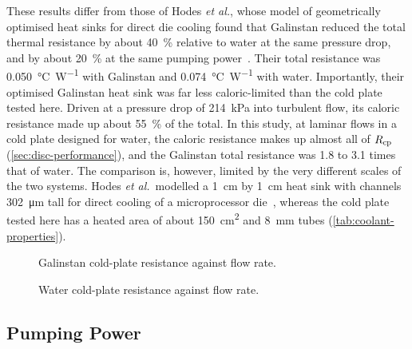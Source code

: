 These results differ from those of Hodes \emph{et al.}, whose model of
geometrically optimised heat sinks for direct die cooling found that Galinstan
reduced the total thermal resistance by about \SI{40}{\percent} relative to
water at the same pressure drop, and by about \SI{20}{\percent} at the same
pumping power~\cite{hodes_potential_2014}. Their total resistance was
\SI{0.050}{\celsius\per\watt} with Galinstan and \SI{0.074}{\celsius\per\watt}
with water. Importantly, their optimised Galinstan heat sink was far less
caloric-limited than the cold plate tested here. Driven at a pressure drop of
\SI{214}{\kilo\pascal} into turbulent flow, its caloric resistance made up about
\SI{55}{\percent} of the total. In this study, at laminar flows in a cold
plate designed for water, the caloric resistance makes up almost all of $R_{\mathrm{cp}}$
(\cref{sec:disc-performance}), and the Galinstan total resistance was 1.8 to 3.1
times that of water. The comparison is, however, limited by the very different
scales of the two systems. Hodes \emph{et al.}\ modelled a
\SI{1}{\centi\metre} by \SI{1}{\centi\metre} heat sink with channels
\SI{302}{\micro\metre} tall for direct cooling of a microprocessor
die~\cite{hodes_potential_2014}, whereas the cold plate tested here has a heated
area of about \SI{150}{\centi\metre\squared} and \SI{8}{\milli\metre} tubes
(\cref{tab:coolant-properties}).

\begin{figure}[htbp]
  \centering
  
  \caption{Galinstan cold-plate resistance against flow rate.}
  \label{fig:galinstan_rcp}
\end{figure}

\begin{figure}[htbp]
  \centering
  
  \caption{Water cold-plate resistance against flow rate.}
  \label{fig:water_rcp}
\end{figure}

\subsection{Pumping Power}
\label{sec:results-pump}

